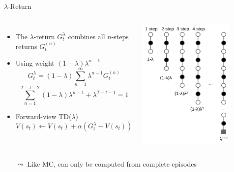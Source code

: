 \begin{frame}[c]{$\lambda$-Return}
	
\begin{columns}
	
	
	\begin{itemize}
		\item The $\lambda$-return $G_t^ {\lambda}$ combines all $n$-steps returns $G_t^{(n)}$
		\item Using weight $(1-\lambda) \lambda^{n-1}$
		$$G_t^\lambda = (1-\lambda) \sum_{n=1}^{\infty} \lambda^{n-1} G_t^{(n)} $$
		$$ \sum_{n=1}^{T-t-2} (1-\lambda) \lambda^{n-1} + \lambda^{T-t-1} = 1 $$
		\item Forward-view TD($\lambda$)
		$$V(s_t) \gets V(s_t) + \alpha \left(G_t^\lambda - V(s_t)\right) $$
	\end{itemize}


\includegraphics[width=0.8\textwidth]{images/td_lambda.png}
	
\end{columns}

\begin{itemize}
	\item[$\leadsto$] Like MC, can only be computed from complete episodes
\end{itemize}
	

	
\end{frame}

